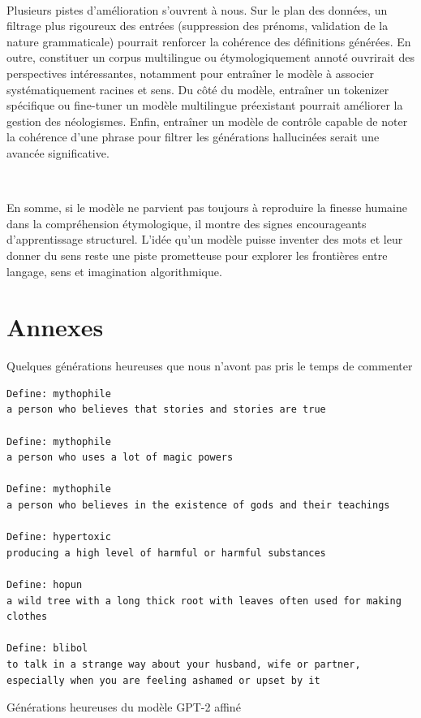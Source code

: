 \documentclass[french]{template}
\begin{document}
\

Plusieurs pistes d’amélioration s’ouvrent à nous. Sur le plan des données, un filtrage plus rigoureux des entrées (suppression des prénoms, validation de la nature grammaticale) pourrait renforcer la cohérence des définitions générées. En outre, constituer un corpus multilingue ou étymologiquement annoté ouvrirait des perspectives intéressantes, notamment pour entraîner le modèle à associer systématiquement racines et sens. Du côté du modèle, entraîner un tokenizer spécifique ou fine-tuner un modèle multilingue préexistant pourrait améliorer la gestion des néologismes. Enfin, entraîner un modèle de contrôle capable de noter la cohérence d'une phrase pour filtrer les générations hallucinées serait une avancée significative.

\

En somme, si le modèle ne parvient pas toujours à reproduire la finesse humaine dans la compréhension étymologique, il montre des signes encourageants d’apprentissage structurel. L’idée qu’un modèle puisse inventer des mots et leur donner du sens reste une piste prometteuse pour explorer les frontières entre langage, sens et imagination algorithmique.

\section{Annexes}

Quelques générations heureuses que nous n'avont pas pris le temps de commenter

\begin{listing}[H]
    \begin{verbatim}
Define: mythophile
a person who believes that stories and stories are true

Define: mythophile
a person who uses a lot of magic powers

Define: mythophile
a person who believes in the existence of gods and their teachings

Define: hypertoxic
producing a high level of harmful or harmful substances

Define: hopun
a wild tree with a long thick root with leaves often used for making clothes

Define: blibol
to talk in a strange way about your husband, wife or partner, especially when you are feeling ashamed or upset by it
    \end{verbatim}
    \caption{Générations heureuses du modèle GPT-2 affiné}
\end{listing}
\end{document}
